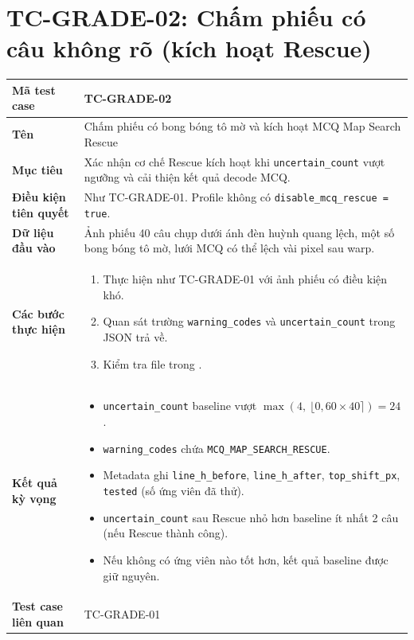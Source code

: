 \section*{TC-GRADE-02: Chấm phiếu có câu không rõ (kích hoạt Rescue)}

\begin{longtable}{|L{3.5cm}|L{10.5cm}|}
\hline
\textbf{Mã test case} & TC-GRADE-02 \\
\hline
\textbf{Tên} & Chấm phiếu có bong bóng tô mờ và kích hoạt MCQ Map Search Rescue \\
\hline
\textbf{Mục tiêu} & Xác nhận cơ chế Rescue kích hoạt khi \texttt{uncertain\_count} vượt ngưỡng và cải thiện kết quả decode MCQ. \\
\hline
\textbf{Điều kiện tiên quyết} & Như TC-GRADE-01. Profile không có \texttt{disable\_mcq\_rescue = true}. \\
\hline
\textbf{Dữ liệu đầu vào} & Ảnh phiếu 40 câu chụp dưới ánh đèn huỳnh quang lệch, một số bong bóng tô mờ, lưới MCQ có thể lệch vài pixel sau warp. \\
\hline
\textbf{Các bước thực hiện} &
\begin{enumerate}[leftmargin=1em]
  \item Thực hiện như TC-GRADE-01 với ảnh phiếu có điều kiện khó.
  \item Quan sát trường \texttt{warning\_codes} và \texttt{uncertain\_count} trong JSON trả về.
  \item Kiểm tra file  trong .
\end{enumerate} \\
\hline
\textbf{Kết quả kỳ vọng} &
\begin{itemize}[leftmargin=1em]
  \item \texttt{uncertain\_count} baseline vượt $\max(4,\ \lfloor 0{,}60 \times 40 \rceil) = 24$.
  \item \texttt{warning\_codes} chứa \texttt{MCQ\_MAP\_SEARCH\_RESCUE}.
  \item Metadata ghi \texttt{line\_h\_before}, \texttt{line\_h\_after}, \texttt{top\_shift\_px}, \texttt{tested} (số ứng viên đã thử).
  \item \texttt{uncertain\_count} sau Rescue nhỏ hơn baseline ít nhất 2 câu (nếu Rescue thành công).
  \item Nếu không có ứng viên nào tốt hơn, kết quả baseline được giữ nguyên.
\end{itemize} \\
\hline
\textbf{Test case liên quan} & TC-GRADE-01 \\
\hline
\end{longtable}


